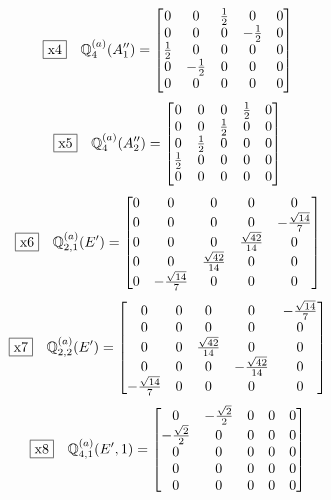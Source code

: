 \documentclass[fleqn,10pt,landscape]{jsarticle}
\begin{document}
\begin{dmath*}
\fbox{x4}\quad \mathbb{Q}_{4}^{(a)}(A_{1}^{\prime\prime})=\begin{bmatrix} 0 & 0 & \frac{1}{2} & 0 & 0 \\ 0 & 0 & 0 & - \frac{1}{2} & 0 \\ \frac{1}{2} & 0 & 0 & 0 & 0 \\ 0 & - \frac{1}{2} & 0 & 0 & 0 \\ 0 & 0 & 0 & 0 & 0 \end{bmatrix}
\end{dmath*}
\begin{dmath*}
\fbox{x5}\quad \mathbb{Q}_{4}^{(a)}(A_{2}^{\prime\prime})=\begin{bmatrix} 0 & 0 & 0 & \frac{1}{2} & 0 \\ 0 & 0 & \frac{1}{2} & 0 & 0 \\ 0 & \frac{1}{2} & 0 & 0 & 0 \\ \frac{1}{2} & 0 & 0 & 0 & 0 \\ 0 & 0 & 0 & 0 & 0 \end{bmatrix}
\end{dmath*}
\begin{dmath*}
\fbox{x6}\quad \mathbb{Q}_{2,1}^{(a)}(E^{\prime})=\begin{bmatrix} 0 & 0 & 0 & 0 & 0 \\ 0 & 0 & 0 & 0 & - \frac{\sqrt{14}}{7} \\ 0 & 0 & 0 & \frac{\sqrt{42}}{14} & 0 \\ 0 & 0 & \frac{\sqrt{42}}{14} & 0 & 0 \\ 0 & - \frac{\sqrt{14}}{7} & 0 & 0 & 0 \end{bmatrix}
\end{dmath*}
\begin{dmath*}
\fbox{x7}\quad \mathbb{Q}_{2,2}^{(a)}(E^{\prime})=\begin{bmatrix} 0 & 0 & 0 & 0 & - \frac{\sqrt{14}}{7} \\ 0 & 0 & 0 & 0 & 0 \\ 0 & 0 & \frac{\sqrt{42}}{14} & 0 & 0 \\ 0 & 0 & 0 & - \frac{\sqrt{42}}{14} & 0 \\ - \frac{\sqrt{14}}{7} & 0 & 0 & 0 & 0 \end{bmatrix}
\end{dmath*}
\begin{dmath*}
\fbox{x8}\quad \mathbb{Q}_{4,1}^{(a)}(E^{\prime},1)=\begin{bmatrix} 0 & - \frac{\sqrt{2}}{2} & 0 & 0 & 0 \\ - \frac{\sqrt{2}}{2} & 0 & 0 & 0 & 0 \\ 0 & 0 & 0 & 0 & 0 \\ 0 & 0 & 0 & 0 & 0 \\ 0 & 0 & 0 & 0 & 0 \end{bmatrix}
\end{dmath*}
\end{document}
